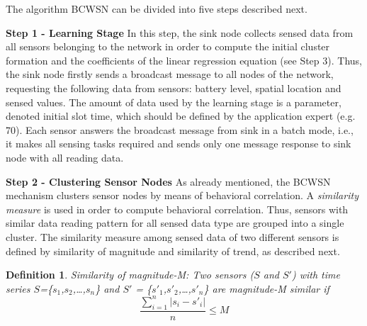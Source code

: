 \documentclass{acm_proc_article-sp}
\begin{document}
The algorithm BCWSN can be divided into five steps described next.
\vspace*{-.3cm}

{\bf Step 1 - Learning Stage}
In this step, the sink node collects sensed data from all sensors belonging to
the network in order to compute the initial cluster formation and the
coefficients of the linear regression equation (see Step 3). Thus, the sink 
node firstly sends a broadcast message to all
nodes of the network, requesting the following data from sensors:
battery level, spatial location and sensed values. The amount of data used by the
learning stage is a parameter, denoted initial slot time, which should be
defined by the application expert (e.g. 70). Each sensor answers the broadcast
message from sink in a batch mode, i.e., it makes all sensing tasks required and
sends only one message response to sink node with all reading data.
\vspace*{-.3cm}

{\bf Step 2 - Clustering Sensor Nodes}
As already mentioned, the BCWSN mechanism clusters sensor nodes by means of
behavioral correlation. A \textit{similarity measure} \cite{Liu2007} is used in
order to compute behavioral correlation. Thus, sensors with similar data reading
pattern for all sensed data type are grouped into a single cluster.
The similarity measure among sensed data of two different sensors is defined by
similarity of magnitude and similarity of trend, as described next.
\vspace*{-.3cm}

\newtheorem{defini}{Definition}

\begin{defini}
Similarity of magnitude-M: Two sensors ($S$ and $S'$) with time series
$S$=\{$s_{1}$,$s_{2}$,\ldots,$s_{n}$\} and
$S'$ = \{$s'_{1}$,$s'_{2}$,\ldots,$s'_{n}$\} are magnitude-M similar if 
\begin{equation}
\label{equ:magni}
\frac{\sum_{i=1}^{n} |s_{i}-s'_{i}|}{n} \leq M
\end{equation}
\end{defini}
\vspace*{-.3cm}
\end{document}
